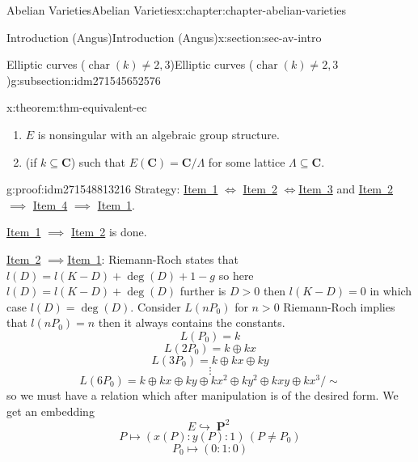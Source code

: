 \documentclass[oneside,10pt,]{book}
\numberwithin{equation}{section}
\newcommand{\CC}{\mathbf{C}}
\DeclareMathOperator{\characteristic}{char}
\DeclareMathOperator{\PP}{\mathbf{P}}
\newcommand{\gt}{>}
\begin{document}
\begin{chapterptx}{Abelian Varieties}{}{Abelian Varieties}{}{}{x:chapter:chapter-abelian-varieties}
\begin{sectionptx}{Introduction (Angus)}{}{Introduction (Angus)}{}{}{x:section:sec-av-intro}
\begin{subsectionptx}{Elliptic curves (\(\characteristic(k) \ne 2,3\))}{}{Elliptic curves (\(\characteristic(k) \ne 2,3\))}{}{}{g:subsection:idm271545652576}
\begin{theorem}{}{}{x:theorem:thm-equivalent-ec}
\begin{enumerate}
\item\hypertarget{x:li:item-nonsing-gp}{}\(E\) is nonsingular with an algebraic group structure.%
\item\hypertarget{x:li:item-cmplx}{}(if \(k \subseteq \CC\)) such that \(E(\CC) = \CC/\Lambda\) for some lattice \(\Lambda \subseteq \CC\).%
\end{enumerate}
%
\end{theorem}
\begin{proofptx}{}{g:proof:idm271548813216}
Strategy: \hyperlink{x:li:item-cubic-eq}{Item~1} \(\iff\) \hyperlink{x:li:item-nonsing-pt}{Item~2} \(\iff\)\hyperlink{x:li:item-nonsing-gp}{Item~3} and \hyperlink{x:li:item-nonsing-pt}{Item~2} \(\implies\) \hyperlink{x:li:item-cmplx}{Item~4} \(\implies\) \hyperlink{x:li:item-cubic-eq}{Item~1}.%
\par
\hyperlink{x:li:item-cubic-eq}{Item~1} \(\implies\) \hyperlink{x:li:item-nonsing-pt}{Item~2} is done.%
\par
\hyperlink{x:li:item-nonsing-pt}{Item~2} \(\implies\)\hyperlink{x:li:item-cubic-eq}{Item~1}: Riemann-Roch states that \(l(D) = l(K-D) +  \deg(D) + 1 -g \) so here \(l(D) = l(K-D) + \deg (D)\) further is \(D\gt 0\) then \(l(K-D) = 0\) in which case \(l(D) = \deg(D)\). Consider \(L(nP_0)\) for \(n \gt 0\) Riemann-Roch implies that \(l(nP_0) = n\) then it always contains the constants.%
\begin{equation*}
L(P_0) = k
\end{equation*}
%
\begin{equation*}
L(2P_0) = k \oplus kx
\end{equation*}
%
\begin{equation*}
L(3P_0) = k \oplus kx \oplus ky
\end{equation*}
%
\begin{equation*}
\vdots
\end{equation*}
%
\begin{equation*}
L(6P_0) = k \oplus kx \oplus ky \oplus k x^2 \oplus ky^2 \oplus kxy \oplus kx^3/\sim
\end{equation*}
so we must have a relation which after manipulation is of the desired form. We get an embedding%
\begin{equation*}
E \hookrightarrow \PP^2
\end{equation*}
%
\begin{equation*}
P\mapsto (x(P):y(P): 1) \,(P\ne P_0)
\end{equation*}
%
\begin{equation*}
P_0 \mapsto (0:1 : 0)
\end{equation*}

\end{proofptx}
\end{subsectionptx}
\end{sectionptx}
\end{chapterptx}
\end{document}
